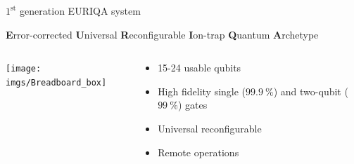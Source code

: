 \documentclass{beamer}
\begin{document}

\begin{frame}{$1^{\text{st}}$ generation EURIQA system}
  \begin{center}
    \textbf{E}rror-corrected \textbf{U}niversal \textbf{R}econfigurable
    \textbf{I}on-trap \textbf{Q}uantum \textbf{A}rchetype
    \begin{columns}
      \column{5.2cm}
      \texttt{[image: imgs/Breadboard\_box]}
      \column{6.3cm}
      \begin{block}{}
        \begin{itemize}
        \item 15-24 usable qubits
        \item<2-> High fidelity single ($99.9\ \%$) and two-qubit ($99\ \%$) gates
        \item<3-> Universal reconfigurable
        \item<4-> Remote operations
        \end{itemize}
      \end{block}
    \end{columns}
  \end{center}
\end{frame}


\end{document}
